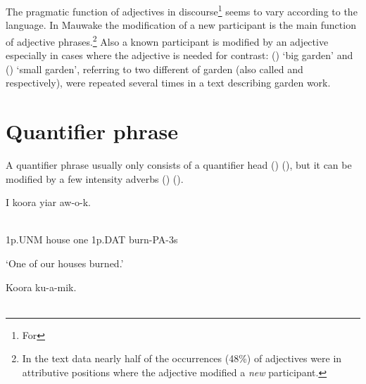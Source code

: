 The pragmatic function of adjectives in discourse\footnote{For } seems to vary according to the language. In Mauwake the modification of a new participant is the main function of adjective phrases.\footnote{In the text data nearly half of the occurrences (48\%) of adjectives were in attributive positions where the adjective modified a \textit{new} participant.} Also a known participant is modified by an adjective especially in cases where the adjective is needed for contrast: ()  `big garden' and () \textstyleEmphasizedWords{} `small garden', referring to two different  of garden (also called  and  respectively), were repeated several times in a text describing garden work. 

\section{Quantifier phrase}
{}
A quantifier phrase usually only consists of a quantifier head () (), but it can be modified by a few intensity adverbs () (). 

\ea%
\label{ex:x845}
\gll I  koora    yiar  aw-o-k. \\
      \\
\glt
\z

1p.UNM  house  one  1p.DAT  burn-PA-3s

`One of our houses burned.'

\ea%
\label{ex:x844}
\gll Koora    ku-a-mik. \\
      \\
\glt
\z

